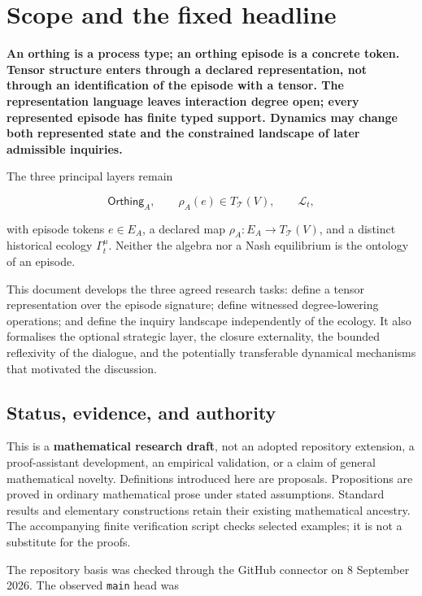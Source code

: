 \documentclass[11pt,a4paper]{article}
\begin{document}
\section{Scope and the fixed
headline}\label{scope-and-the-fixed-headline}

\textbf{An orthing is a process type; an orthing episode is a concrete
token. Tensor structure enters through a declared representation, not
through an identification of the episode with a tensor. The
representation language leaves interaction degree open; every
represented episode has finite typed support. Dynamics may change both
represented state and the constrained landscape of later admissible
inquiries.}

The three principal layers remain

\nopagebreak[4]

\[
\mathsf{Orthing}_A,\qquad
\rho_A(e)\in T_{\mathcal T}(V),\qquad
\mathcal L_t,
\]

with episode tokens \(e\in E_A\), a declared map
\(\rho_A:E_A\to T_{\mathcal T}(V)\), and a distinct historical ecology
\(\Gamma_t^\mu\). Neither the algebra nor a Nash equilibrium is the
ontology of an episode.

This document develops the three agreed research tasks: define a tensor
representation over the episode signature; define witnessed
degree-lowering operations; and define the inquiry landscape
independently of the ecology. It also formalises the optional strategic
layer, the closure externality, the bounded reflexivity of the dialogue,
and the potentially transferable dynamical mechanisms that motivated the
discussion.

\subsection{Status, evidence, and
authority}\label{status-evidence-and-authority}

This is a \textbf{mathematical research draft}, not an adopted
repository extension, a proof-assistant development, an empirical
validation, or a claim of general mathematical novelty. Definitions
introduced here are proposals. Propositions are proved in ordinary
mathematical prose under stated assumptions. Standard results and
elementary constructions retain their existing mathematical ancestry.
The accompanying finite verification script checks selected examples; it
is not a substitute for the proofs.

The repository basis was checked through the GitHub connector on 8
September 2026. The observed \texttt{main} head was
\end{document}
